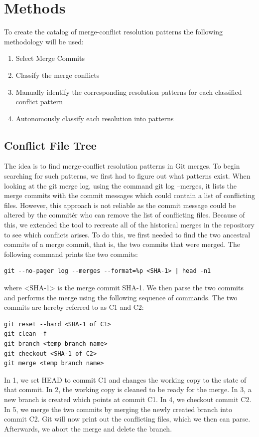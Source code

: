 \chapter{Methods}
To create the catalog of merge-conflict resolution patterns the following methodology will be used:
\begin{enumerate}
\item Select Merge Commits
\item Classify the merge conflicts
\item Manually identify the corresponding resolution patterns for each classified conflict pattern
\item Autonomously classify each resolution into patterns
\end{enumerate}
\section{Conflict File Tree}
The idea is to find merge-conflict resolution patterns in Git merges. To begin searching for such patterns, we first had to figure out what patterns exist. When looking at the git merge log, using the command git log --merges, it lists the merge commits with the commit messages which could contain a list of conflicting files. However, this approach is not reliable as the commit message could be altered by the commitér who can remove the list of conflicting files. Because of this, we extended the tool to recreate all of the historical merges in the repository to see which conflicts arises. To do this, we first needed to find the two ancestral commits of a merge commit, that is, the two commits that were merged. The following command prints the two commits:
\lstset{language=Bash}
\begin{lstlisting}[frame=single]
git --no-pager log --merges --format=%p <SHA-1> | head -n1
\end{lstlisting}
where <SHA-1> is the merge commit SHA-1. We then parse the two commits and performs the merge using the following sequence of commands. The two commits are hereby referred to as C1 and C2:\\
\lstset{language=Bash}
\begin{lstlisting}[frame=single]
git reset --hard <SHA-1 of C1>
git clean -f
git branch <temp branch name>
git checkout <SHA-1 of C2>
git merge <temp branch name>
\end{lstlisting}
In 1, we set HEAD to commit C1 and changes the working copy to the state of that commit. In 2,  the working copy is cleaned to be ready for the merge. In 3, a new branch is created which points at commit C1. In 4, we checkout commit C2. In 5, we merge the two commits by merging the newly created branch into commit C2. Git will now print out the conflicting files, which we then can parse. Afterwards, we abort the merge and delete the branch.
